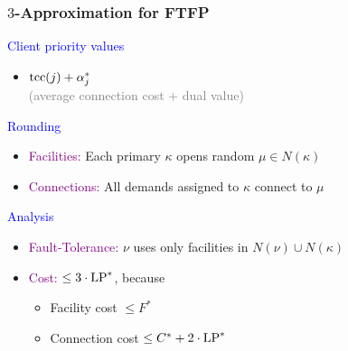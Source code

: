 \documentclass[hyperref,dvipsnames,svgnames,compress]{beamer}
\begin{document}
\begin{frame}
  \frametitle{$3$-Approximation for FTFP}

{\large

\textcolor{blue}{Client priority values}	
	
	\begin{itemize}
		\item $\mbox{\rm{tcc}}(j) + \alpha_j^\ast$
		\\
		{\normalsize \textcolor{gray}{(average connection cost + dual value)}}
	\end{itemize}
	
\textcolor{blue}{Rounding}

  	\begin{itemize}
  	\item \textcolor{purple}{Facilities:}
 					Each primary $\kappa$ opens random $\mu\in N(\kappa)$
  	\item \textcolor{purple}{Connections:}
 					All demands assigned to $\kappa$ connect to $\mu$
  	\end{itemize}

\textcolor{blue}{Analysis}

  \begin{itemize}
  	\item \textcolor{purple}{Fault-Tolerance:}
 			$\nu$ uses only facilities in $N(\nu) \cup N(\kappa)$
  	\item \textcolor{purple}{Cost:} $\le 3\cdot\mbox{\rm LP}^\ast$, because
    	\begin{itemize}
    		\item Facility cost $\le F^\ast$
    		\item Connection cost $\le C^\ast + 2\cdot\mbox{\rm LP}^\ast$
    	\end{itemize}
 	\end{itemize}
}
\end{frame}

\end{document}
